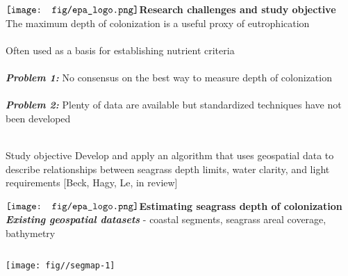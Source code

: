 \documentclass[serif]{beamer}\usepackage[]{graphicx}\usepackage[]{color}
\makeatletter
\def\maxwidth{ %
  \ifdim\Gin@nat@width>\linewidth
    \linewidth
  \else
    \Gin@nat@width
  \fi
}
\newenvironment{knitrout}{}{} %
\newcommand{\emtxt}[1]{\textbf{\textit{{\color{mypal4} #1}}}}
\makeatother
\begin{document}
\begin{frame}{$\vcenter{\hbox{\texttt{[image: fig/epa\_logo.png]}}}$\hspace{0.07in}\textbf{Research challenges and study objective}}
\onslide<+->
The maximum depth of colonization is a useful proxy of eutrophication {\tiny \cite{Kenworthy96,Choice14}} \\~\\
Often used as a basis for establishing nutrient criteria {\tiny \cite{Steward07}}\\~\\
\onslide<+->
\emtxt{Problem 1:} No consensus on the best way to measure depth of colonization \\~\\
\emtxt{Problem 2:} Plenty of data are available but standardized techniques have not been developed \\~\\
\onslide<+->
\begin{block}{Study objective}
Develop and apply an algorithm that uses geospatial data to describe relationships between seagrass depth limits, water clarity, and light requirements \scriptsize [Beck, Hagy, Le, in review]
\end{block}
\end{frame}

\begin{frame}{$\vcenter{\hbox{\texttt{[image: fig/epa\_logo.png]}}}$\hspace{0.07in}\textbf{Estimating seagrass depth of colonization}}
\onslide<+->
\emtxt{Existing geospatial datasets} - coastal segments, seagrass areal coverage, bathymetry
\begin{columns}[T]
\begin{column}{0.5\textwidth}
\begin{knitrout}
\color{fgcolor}

{\centering \texttt{[image: fig//segmap-1]} 

}



\end{knitrout}
\end{column}
\begin{column}{0.45\textwidth}
\centerline{}
\end{column}
\end{columns}
\end{frame}
\end{document}
